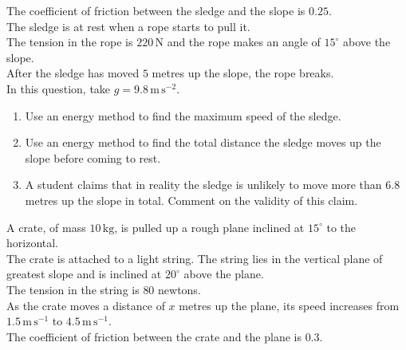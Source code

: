 \documentclass[leqno]{article}
\begin{document}
\begin{enumerate}[
  label=\textbf{\arabic*.},
  leftmargin=*,
  topsep=0pt,
  partopsep=0pt,
  parsep=0pt
]
The coefficient of friction between the sledge and the slope is $0.25$. \\

The sledge is at rest when a rope starts to pull it. \\

The tension in the rope is $220\,\mathrm{N}$ and the rope makes an angle of $15^\circ$ above the slope. \\

After the sledge has moved $5$ metres up the slope, the rope breaks. \\

In this question, take $g = 9.8\,\mathrm{m\,s^{-2}}$. \\

\begin{enumerate}[label=\textbf{(\alph*)}]
  \item Use an energy method to find the maximum speed of the sledge.  \\
  \item Use an energy method to find the total distance the sledge moves up the slope before coming to rest.  \\
  \item A student claims that in reality the sledge is unlikely to move more than $6.8$ metres up the slope in total. Comment on the validity of this claim.  \\
\end{enumerate}

\newpage

\questionitem


A crate, of mass $10\,\mathrm{kg}$, is pulled up a rough plane inclined at $15^\circ$ to the horizontal. \\

The crate is attached to a light string. The string lies in the vertical plane of greatest slope and is inclined at $20^\circ$ above the plane. \\

The tension in the string is $80$ newtons. \\

As the crate moves a distance of $x$ metres up the plane, its speed increases from $1.5\,\mathrm{m\,s^{-1}}$ to $4.5\,\mathrm{m\,s^{-1}}$. \\

The coefficient of friction between the crate and the plane is $0.3$. \\


\end{enumerate}
\end{document}
